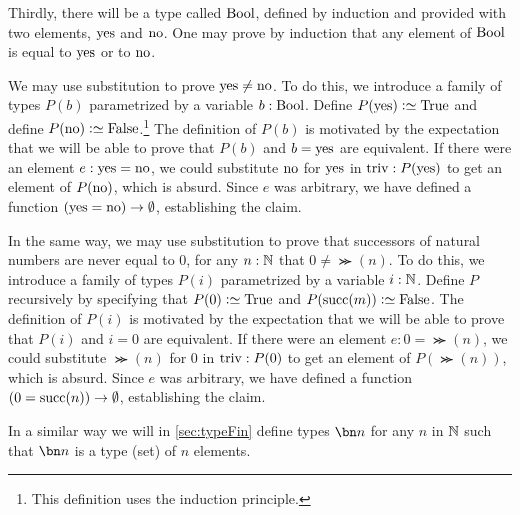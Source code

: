 Thirdly, there will be a type called $\mathrm{Bool}$,
defined by induction and provided with two elements, $\mathrm{yes}$ and $\mathrm{no}$.
One may prove by induction
that any element of $\mathrm{Bool}$ is equal to $\mathrm{yes}$ or to $\mathrm{no}$.

We may use substitution to prove $\mathrm{yes} \ne \mathrm{no}$.  To do this, we introduce a family of types $P(b)$ parametrized by a variable $b:\mathrm{Bool}$.
Define $P(\yes) \defeq \true$ and define $P(\no) \defeq \false$.\footnote{%
  This definition uses the induction principle.}
The definition of $P(b)$ is motivated by the expectation that we will be able
to prove that $P(b)$ and $b = \mathrm{yes}$ are equivalent.  If there were an element $e: \mathrm{yes} = \mathrm{no}$, we could substitute $\mathrm{no}$ for $\mathrm{yes}$ in $\mathrm{triv} :
P (\mathrm{yes})$ to get an element of $P(\mathrm{no})$, which is absurd.  Since $e$ was arbitrary, we have defined a function $(\mathrm{yes}=\mathrm{no}) \to \emptyset$,
establishing the claim.

In the same way, we may use substitution to prove that successors of natural numbers are never equal to $0$, \ie for any $n:\mathbb{N}$ that $0 \ne
\Succ(n)$.  To do this, we introduce a family of types $P(i)$ parametrized by a variable $i:\mathbb{N}$.  Define $P$ recursively by specifying that $P(0)
\defeq \true$ and $P(\Succ(m)) \defeq \false$.  The definition of $P(i)$ is motivated by the expectation that we will be able to prove that $P(i)$
and $i = 0$ are equivalent.  If there were an element $e: 0 = \Succ(n)$, we could substitute $\Succ(n)$ for $0$ in $\mathrm{triv} : P ( 0 )$ to get an element
of $P(\Succ(n))$, which is absurd.  Since $e$ was arbitrary, we have defined a function $(0=\Succ(n)) \to \emptytype$, establishing the claim.

In a similar way we will in \cref{sec:typeFin} define types $\bn n$ for any $n$ in $\mathbb{N}$
such that $\bn n$ is a type (set) of $n$ elements.


